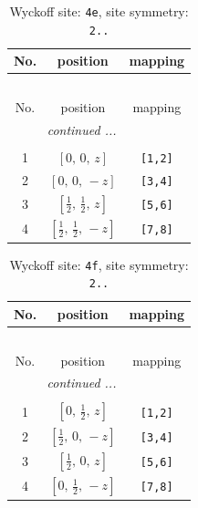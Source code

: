 \documentclass[fleqn,8pt]{jsarticle}
\begin{document}
\begin{longtable}{ccc}
\caption{Wyckoff site: {\tt 4e}, site symmetry: {\tt 2..}}
 \\
 \hline \hline
No. & position & mapping \\ \hline \endfirsthead

\multicolumn{2}{l}{\tablename\ \thetable{}} \\
 \hline \hline
No. & position & mapping \\ \hline \endhead

 \hline \hline
\multicolumn{2}{r}{\footnotesize\it continued ...} \\ \endfoot

 \hline \hline
\multicolumn{2}{r}{} \\ \endlastfoot

1 & $\left[ 0,\, 0,\, z \right]$ & {\tt [1,2]} \\ \hline
2 & $\left[ 0,\, 0,\, - z \right]$ & {\tt [3,4]} \\ \hline
3 & $\left[ \frac{1}{2},\, \frac{1}{2},\, z \right]$ & {\tt [5,6]} \\ \hline
4 & $\left[ \frac{1}{2},\, \frac{1}{2},\, - z \right]$ & {\tt [7,8]} \\
\end{longtable}
\renewcommand{\arraystretch}{1.2}
\begin{longtable}{ccc}
\caption{Wyckoff site: {\tt 4f}, site symmetry: {\tt 2..}}
 \\
 \hline \hline
No. & position & mapping \\ \hline \endfirsthead

\multicolumn{2}{l}{\tablename\ \thetable{}} \\
 \hline \hline
No. & position & mapping \\ \hline \endhead

 \hline \hline
\multicolumn{2}{r}{\footnotesize\it continued ...} \\ \endfoot

 \hline \hline
\multicolumn{2}{r}{} \\ \endlastfoot

1 & $\left[ 0,\, \frac{1}{2},\, z \right]$ & {\tt [1,2]} \\ \hline
2 & $\left[ \frac{1}{2},\, 0,\, - z \right]$ & {\tt [3,4]} \\ \hline
3 & $\left[ \frac{1}{2},\, 0,\, z \right]$ & {\tt [5,6]} \\ \hline
4 & $\left[ 0,\, \frac{1}{2},\, - z \right]$ & {\tt [7,8]} \\
\end{longtable}
\end{document}
